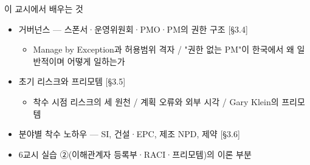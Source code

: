 \begin{frame}[allowframebreaks=1.0]{이 교시에서 배우는 것}
\small
\begin{itemize}
\item\relax 거버넌스 — 스폰서·운영위원회·PMO·PM의 권한 구조 [§3.4]
\par\nobreak
\begin{itemize}
\item\relax Manage by Exception과 허용범위 격자 / "권한 없는 PM"이 한국에서 왜 일반적이며 어떻게 일하는가
\end{itemize}
\item\relax 초기 리스크와 프리모템 [§3.5]
\par\nobreak
\begin{itemize}
\item\relax 착수 시점 리스크의 세 원천 / 계획 오류와 외부 시각 / Gary Klein의 프리모템
\end{itemize}
\item\relax 분야별 착수 노하우 — SI, 건설·EPC, 제조 NPD, 제약 [§3.6]
\item\relax 6교시 실습 ②(이해관계자 등록부·RACI·프리모템)의 이론 부분
\end{itemize}
\end{frame}

